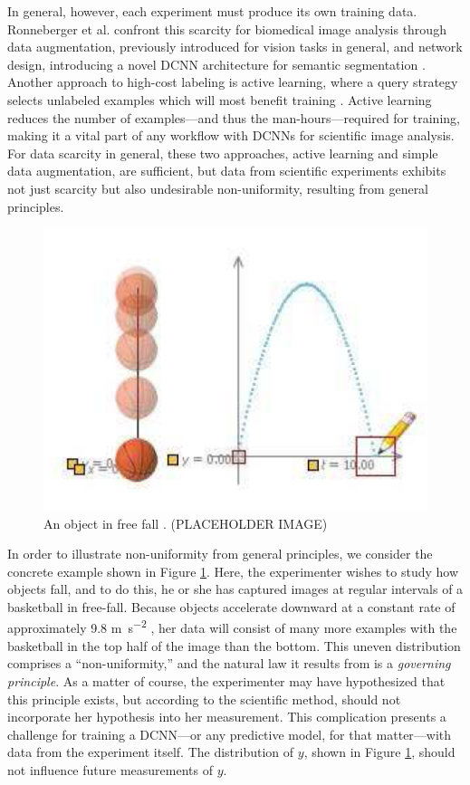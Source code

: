 \documentclass[10pt, draftcls]{IEEEtran}
\begin{document}
In general, however, each experiment must produce its own training
data. Ronneberger et al. confront this scarcity for biomedical image analysis
through data augmentation, previously introduced for vision tasks in general,
and network design, introducing a novel DCNN architecture for semantic
segmentation \cite{krizhevsky_imagenet_2012, ronneberger_u-net:_2015}. Another
approach to high-cost labeling is active learning, where a query strategy
selects unlabeled examples which will most benefit training
\cite{settles_active_2012}. Active learning reduces the number of examples---and
thus the man-hours---required for training, making it a vital part of any
workflow with DCNNs for scientific image analysis. For data scarcity in general,
these two approaches, active learning and simple data augmentation, are
sufficient, but data from scientific experiments exhibits not just scarcity but
also undesirable non-uniformity, resulting from general principles.

\begin{figure}
  \centering
  \includegraphics[width=\linewidth]{free_fall}
  \caption{An object in free fall \cite{duquevieira_simple_2012}. (PLACEHOLDER
    IMAGE)}
  \label{fig:free-fall}
\end{figure}

In order to illustrate non-uniformity from general principles, we consider the
concrete example shown in Figure \ref{fig:free-fall}. Here, the experimenter
wishes to study how objects fall, and to do this, he or she has captured images
at regular intervals of a basketball in free-fall. Because objects accelerate
downward at a constant rate of approximately 9.8 \si{\meter\per\second^2}
\cite{munroe_wikipedian_nodate}, her data will consist of many more examples
with the basketball in the top half of the image than the bottom. This uneven
distribution comprises a ``non-uniformity,'' and the natural law it results from
is a \emph{governing principle}. As a matter of course, the experimenter may
have hypothesized that this principle exists, but according to the scientific
method, should not incorporate her hypothesis into her measurement. This
complication presents a challenge for training a DCNN---or any predictive model,
for that matter---with data from the experiment itself. The distribution of $y$,
shown in Figure \ref{fig:free-fall}, should not influence future measurements of
$y$.
\end{document}
